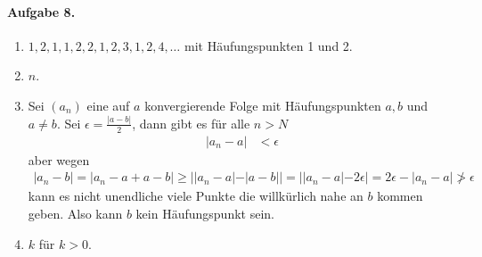 \documentclass{article}
\begin{document}
\paragraph*{Aufgabe 8.}
\begin{enumerate}
    \item $1, 2, 1, 1, 2, 2, 1, 2, 3, 1, 2, 4, \ldots$ mit Häufungspunkten 1 und 2.

    \item $n$.

    \item Sei $(a_n)$ eine auf $a$ konvergierende Folge mit Häufungspunkten $a, b$ und $a \neq b$. Sei $\epsilon = \frac{|a - b|}{2}$, dann gibt es für alle $n > N$
    \begin{align*}
        |a_n - a| &< \epsilon
    \end{align*}
    aber wegen
    \begin{align*}
        |a_n - b| = |a_n - a + a - b| \geq ||a_n - a| - |a - b|| = ||a_n - a| - 2\epsilon| = 2\epsilon - |a_n - a| \not> \epsilon
    \end{align*}
    kann es nicht unendliche viele Punkte die willkürlich nahe an $b$ kommen geben. Also kann $b$ kein Häufungspunkt sein.

    \item $k$ für $k > 0$.
\end{enumerate}
\end{document}
